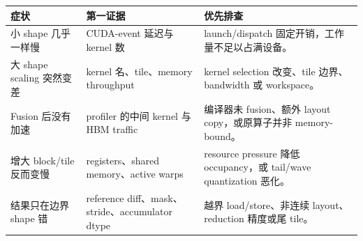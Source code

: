 \begin{longtable}{p{}p{}p{}}
\toprule
\textbf{症状} & \textbf{第一证据} & \textbf{优先排查} \\
\midrule
小 shape 几乎一样慢 & CUDA-event 延迟与 kernel 数 & launch/dispatch 固定开销，工作量不足以占满设备。 \\
大 shape scaling 突然变差 & kernel 名、tile、memory throughput & kernel selection 改变、tile 边界、bandwidth 或 workspace。 \\
Fusion 后没有加速 & profiler 的中间 kernel 与 HBM traffic & 编译器未 fusion、额外 layout copy，或原算子并非 memory-bound。 \\
增大 block/tile 反而变慢 & registers、shared memory、active warps & resource pressure 降低 occupancy，或 tail/wave quantization 恶化。 \\
结果只在边界 shape 错 & reference diff、mask、stride、accumulator dtype & 越界 load/store、非连续 layout、reduction 精度或尾 tile。 \\
\bottomrule
\end{longtable}


